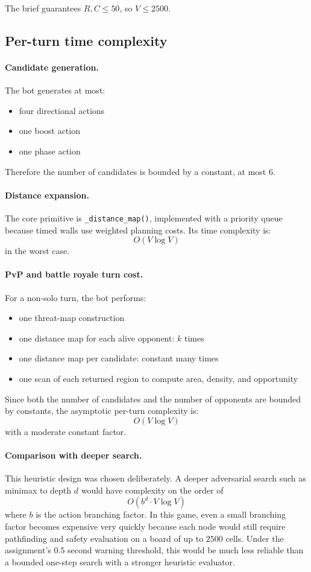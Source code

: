\documentclass[11pt,a4paper]{article}
\begin{document}
The brief guarantees \(R, C \le 50\), so \(V \le 2500\).

\subsection{Per-turn time complexity}
\paragraph{Candidate generation.}
The bot generates at most:
\begin{itemize}[leftmargin=*]
    \item four directional actions
    \item one boost action
    \item one phase action
\end{itemize}
Therefore the number of candidates is bounded by a constant, at most \(6\).

\paragraph{Distance expansion.}
The core primitive is \texttt{\_distance\_map()}, implemented with a priority queue because timed walls use weighted planning costs. Its time complexity is:
\[
O(V \log V)
\]
in the worst case.

\paragraph{PvP and battle royale turn cost.}
For a non-solo turn, the bot performs:
\begin{itemize}[leftmargin=*]
    \item one threat-map construction
    \item one distance map for each alive opponent: \(k\) times
    \item one distance map per candidate: constant many times
    \item one scan of each returned region to compute area, density, and opportunity
\end{itemize}

Since both the number of candidates and the number of opponents are bounded by constants, the asymptotic per-turn complexity is:
\[
O(V \log V)
\]
with a moderate constant factor.

\paragraph{Comparison with deeper search.}
This heuristic design was chosen deliberately. A deeper adversarial search such as minimax to depth \(d\) would have complexity on the order of
\[
O(b^d \cdot V \log V)
\]
where \(b\) is the action branching factor. In this game, even a small branching factor becomes expensive very quickly because each node would still require pathfinding and safety evaluation on a board of up to \(2500\) cells. Under the assignment's \(0.5\) second warning threshold, this would be much less reliable than a bounded one-step search with a stronger heuristic evaluator.
\end{document}
